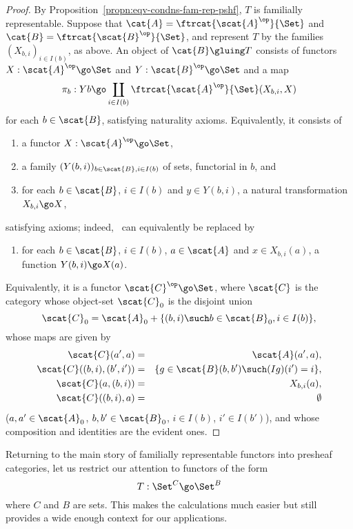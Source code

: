 \begin{proof}
By Proposition~\ref{propn:eqv-condns-fam-rep-pshf}, $T$ is familially
representable.  Suppose that $\cat{A} = \ftrcat{\scat{A}^\op}{\Set}$ and
$\cat{B} = \ftrcat{\scat{B}^\op}{\Set}$, and represent $T$ by the families
$(X_{b,i})_{i\in I(b)}$, as above.  An object of $\cat{B}\gluing T$
consists of functors $X: \scat{A}^\op \go \Set$ and $Y: \scat{B}^\op \go
\Set$ and a map
\[
\pi_b: Yb \go \coprod_{i\in I(b)} 
\ftrcat{\scat{A}^\op}{\Set} (X_{b,i}, X)
\]
for each $b\in \scat{B}$, satisfying naturality axioms.  Equivalently, it
consists of
%
\begin{enumerate}
\item a functor $X: \scat{A}^\op \go \Set$,
\item a family $(Y(b,i))_{b\in\scat{B}, i\in I(b)}$ of sets, functorial in
$b$, and
\item	{}
for each $b\in\scat{B}$, $i\in I(b)$ and $y\in Y(b,i)$, a natural
transformation $X_{b,i} \go X$, 
\end{enumerate}
%
satisfying axioms; indeed,~ can equivalently
be replaced by
%
\begin{enumerate}
\newcommand{\temptheenumi}{\theenumi}
\renewcommand{\theenumi}{\ref{item:gluing-object-three}$'$}
\item
\renewcommand{\theenumi}{\temptheenumi} 
%
for each $b\in\scat{B}$, $i\in I(b)$, $a\in\scat{A}$ and $x\in X_{b,i}(a)$,
a function $Y(b,i) \go X(a)$.
\end{enumerate}
%
Equivalently, it is a functor $\scat{C}^\op \go \Set$, where $\scat{C}$ is
the category whose object-set $\scat{C}_0$ is the disjoint union
\[
\scat{C}_0 = \scat{A}_0 + \{(b, i) \such b\in\scat{B}_0, i\in I(b)\},
\]
whose maps are given by
%
\begin{eqnarray*}
\scat{C}(a', a)		&=	&\scat{A}(a', a),			\\
\scat{C}((b,i), (b',i'))&=	&\{g\in\scat{B}(b,b') \such (Ig)(i')=i\},\\
\scat{C}(a, (b,i))	&=	&X_{b,i}(a),				\\
\scat{C}((b,i), a)	&=	&\emptyset
\end{eqnarray*}
%
($a, a' \in \scat{A}_0$, $b, b'\in \scat{B}_0$, $i\in I(b)$, $i'\in
I(b')$), and whose composition and identities are the evident ones.
\done  
\end{proof}

%
%
%
%
Returning to the main story of familially representable functors into
presheaf categories, let us restrict our attention to functors of the form
\[
T: \Set^C \go \Set^B
\]
where $C$ and $B$ are sets.  This makes the calculations much easier but
still provides a wide enough context for our applications. 

